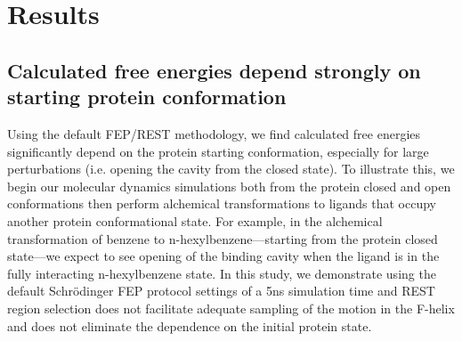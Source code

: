 \documentclass[journal=jctcce,manuscript=article]{achemso}
\begin{document}
\section{Results}
\subsection*{Calculated free energies depend strongly on starting protein conformation}
Using the default FEP/REST methodology\cite{FEP/REST}, we find calculated free energies significantly depend on the protein starting conformation, especially for large perturbations (i.e. opening the cavity from the closed state).
To illustrate this, we begin our molecular dynamics simulations both from the protein closed and open conformations then perform alchemical transformations to ligands that occupy another protein conformational state.
For example, in the alchemical transformation of benzene to n-hexylbenzene---starting from the protein closed state---we expect to see opening of the binding cavity when the ligand is in the fully interacting n-hexylbenzene state.
In this study, we demonstrate using the default Schr\"{o}dinger FEP protocol settings of a 5ns simulation time and REST region selection does not facilitate adequate sampling of the motion in the F-helix and does not eliminate the dependence on the initial protein state.

\end{document}
